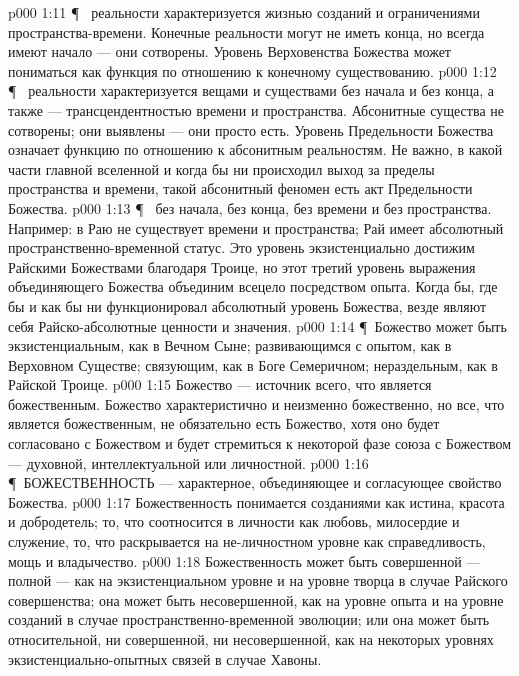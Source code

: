 \vs p000 1:11 \P\  реальности характеризуется жизнью созданий и ограничениями пространства\hyp{}времени. Конечные реальности могут не иметь конца, но всегда имеют начало --- они сотворены. Уровень Верховенства Божества может пониматься как функция по отношению к конечному существованию.
\vs p000 1:12 \P\  реальности характеризуется вещами и существами без начала и без конца, а также --- трансцендентностью времени и пространства. Абсонитные существа не сотворены; они выявлены --- они просто есть. Уровень Предельности Божества означает функцию по отношению к абсонитным реальностям. Не важно, в какой части главной вселенной и когда бы ни происходил выход за пределы пространства и времени, такой абсонитный феномен есть акт Предельности Божества.
\vs p000 1:13 \P\  без начала, без конца, без времени и без пространства. Например: в Раю не существует времени и пространства; Рай имеет абсолютный пространственно\hyp{}временной статус. Это уровень экзистенциально достижим Райскими Божествами благодаря Троице, но этот третий уровень выражения объединяющего Божества объединим всецело посредством опыта. Когда бы, где бы и как бы ни функционировал абсолютный уровень Божества, везде являют себя Райско\hyp{}абсолютные ценности и значения.
\vs p000 1:14 \P\ Божество может быть экзистенциальным, как в Вечном Сыне; развивающимся с опытом, как в Верховном Существе; связующим, как в Боге Семеричном; нераздельным, как в Райской Троице.
\vs p000 1:15 Божество --- источник всего, что является божественным. Божество характеристично и неизменно божественно, но все, что является божественным, не обязательно есть Божество, хотя оно будет согласовано с Божеством и будет стремиться к некоторой фазе союза с Божеством --- духовной, интеллектуальной или личностной.
\vs p000 1:16 \P\ БОЖЕСТВЕННОСТЬ --- характерное, объединяющее и согласующее свойство Божества.
\vs p000 1:17 Божественность понимается созданиями как истина, красота и добродетель; то, что соотносится в личности как любовь, милосердие и служение, то, что раскрывается на не\hyp{}личностном уровне как справедливость, мощь и владычество.
\vs p000 1:18 Божественность может быть совершенной --- полной --- как на экзистенциальном уровне и на уровне творца в случае Райского совершенства; она может быть несовершенной, как на уровне опыта и на уровне созданий в случае пространственно\hyp{}временной эволюции; или она может быть относительной, ни совершенной, ни несовершенной, как на некоторых уровнях экзистенциально\hyp{}опытных связей в случае Хавоны.
